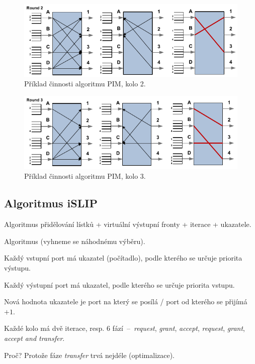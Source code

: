 \begin{figure}[H]
    \centering
    \includegraphics[width=1\linewidth]{algoritmus_pim_priklad_2.pdf}
    \caption{Příklad činnosti algoritmu PIM, kolo 2.}
\end{figure}

\begin{figure}[H]
    \centering
    \includegraphics[width=1\linewidth]{algoritmus_pim_priklad_3.pdf}
    \caption{Příklad činnosti algoritmu PIM, kolo 3.}
\end{figure}

\subsection{Algoritmus iSLIP}

\begin{compactitem}
    \item Algoritmus přidělování lístků + virtuální výstupní fronty + iterace + ukazatele.
    \item Algoritmus  (vyhneme se náhodnému výběru). \begin{compactitem}
        \item Každý vstupní port má ukazatel (počítadlo), podle kterého se určuje priorita výstupu.
        \item Každý výstupní port má ukazatel, podle kterého se určuje priorita vstupu.
        \item Nová hodnota ukazatele je port na který se posílá / port od kterého se přijímá $+ 1$.
    \end{compactitem}
    \item Každé kolo má dvě iterace, resp. 6 fází~--~\textit{request}, \textit{grant}, \textit{accept}, \textit{request}, \textit{grant}, \textit{accept and transfer}. \begin{compactitem}
        \item Proč? Protože fáze \textit{transfer} trvá nejdéle (optimalizace).
    \end{compactitem}
\end{compactitem}


